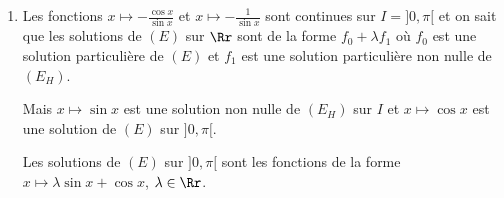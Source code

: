{{\begin{enumerate}
Soit $f$ une fonction dérivable sur $\Rr$.

\begin{align*}\ensuremath
f\;\mbox{solution de}\;(E)\;\mbox{sur}\;\Rr&\Leftrightarrow\forall x\in\Rr,\;f'(x)+f(x)=\frac{1}{1+2e^x}
\Leftrightarrow\forall x\in\Rr,\;e^xf'(x)+e^xf(x)=\frac{e^x}{1+2e^x}\\
 &\Leftrightarrow\exists\lambda\in\Rr/\;\forall x\in\Rr,\;e^xf(x)=\frac{1}{2}\ln(1+2e^x)+\lambda\\
 &\Leftrightarrow\exists\lambda\in\Rr/\;\forall x\in\Rr,\;f(x)=(\frac{1}{2}\ln(1+2e^x)+\lambda)e^{-x}
\end{align*}

Les solutions de $(E)$ sur  $\Rr$ sont les fonctions de la forme
$x\mapsto(\frac{1}{2}\ln(1+2e^x)+\lambda)e^{-x}$,$\lambda\in\Rr$.

\item  Les fonctions $x\mapsto-\frac{\cos x}{\sin x}$ et $x\mapsto-\frac{1}{\sin x}$ sont continues sur $I=]0,\pi[$
et on sait que les solutions de $(E)$ sur $\Rr$ sont de la forme
$f_0+\lambda f_1$ où $f_0$ est une solution particulière de $(E)$ et $f_1$ est une solution particulière non nulle de
$(E_H)$.

Mais $x\mapsto\sin x$ est une solution non nulle de $(E_H)$ sur $I$ et $x\mapsto\cos x$ est une solution de $(E)$ sur
$]0,\pi[$.

Les solutions de $(E)$ sur  $]0,\pi[$ sont les fonctions de la forme $x\mapsto\lambda\sin x+\cos x$, $\lambda\in\Rr$.

\end{enumerate}}
}